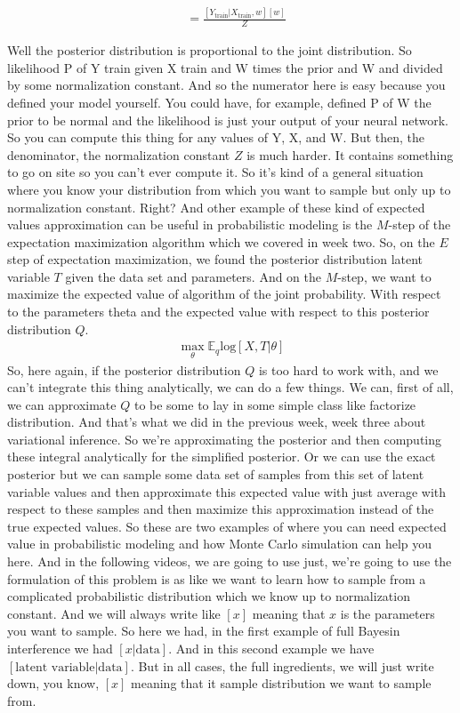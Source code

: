 \documentclass[11pt, oneside, reqno]{amsart}
\numberwithin{equation}{section}
\theoremstyle{plain}%
\theoremstyle{definition}
\theoremstyle{remark}
\newcommand{\E}{\mathbb{E}}
\begin{document}
\begin{align*}
	[w|Y_{\text{train}},X_{\text{train}}]
	&=\frac{[Y_{\text{train}}|X_{\text{train}},w][w]}{Z}
\end{align*}
  
  Well the posterior distribution is proportional to the joint distribution. So likelihood P of Y train given X train and W times the prior and W and divided by some normalization constant. And so the numerator here is easy because you defined your model yourself. You could have, for example, defined P of W the prior to be normal and the likelihood is just your output of your neural network. So you can compute this thing for any values of Y, X, and W. But then, the denominator, the normalization constant $Z$ is much harder. It contains something to go on site so you can't ever compute it. So it's kind of a general situation where you know your distribution from which you want to sample but only up to normalization constant. Right? And other example of these kind of expected values approximation can be useful in probabilistic modeling is the $M$-step of the expectation maximization algorithm which we covered in week two. So, on the $E$ step of expectation maximization, we found the posterior distribution latent variable $T$ given the data set and parameters. And on the $M$-step, we want to maximize the expected value of algorithm of the joint probability. With respect to the parameters theta and the expected value with respect to this posterior distribution $Q$.
  \begin{align*}
  	\max_{\theta}\E_q\text{log}[X,T|\theta]
  \end{align*}
So, here again, if the posterior distribution $Q$ is too hard to work with, and we can't integrate this thing analytically, we can do a few things. We can, first of all, we can approximate $Q$ to be some to lay in some simple class like factorize distribution. And that's what we did in the previous week, week three about variational inference. So we're approximating the posterior and then computing these integral analytically for the simplified posterior. Or we can use the exact posterior but we can sample some data set of samples from this set of latent variable values and then approximate this expected value with just average with respect to these samples and then maximize this approximation instead of the true expected values. So these are two examples of where you can need expected value in probabilistic modeling and how Monte Carlo simulation can help you here. And in the following videos, we are going to use just, we're going to use the formulation of this problem is as like we want to learn how to sample from a complicated probabilistic distribution which we know up to normalization constant. And we will always write like $[x]$ meaning that $x$ is the parameters you want to sample. So here we had, in the first example of full Bayesin interference we had $[x|\text{data}]$. And in this second example we have $[\text{latent variable}|\text{data}]$. But in all cases, the full ingredients, we will just write down, you know, $[x]$ meaning that it sample distribution we want to sample from.
\end{document}

